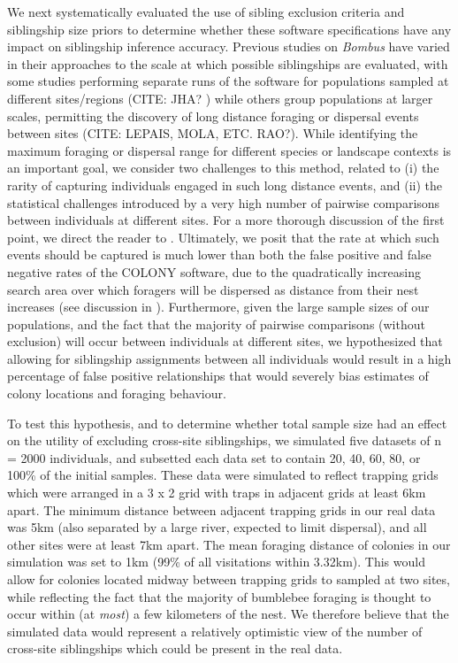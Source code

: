 \documentclass[12pt]{article}
\begin{document}
We next systematically evaluated the use of sibling exclusion criteria and siblingship size priors to determine whether these software specifications have any impact on siblingship inference accuracy. Previous studies on \emph{Bombus} have varied in their approaches to the scale at which possible siblingships are evaluated, with some studies performing separate runs of the software for populations sampled at different sites/regions (CITE: JHA? ) while others group populations at larger scales, permitting the discovery of long distance foraging or dispersal events between sites (CITE: LEPAIS, MOLA, ETC. RAO?). While identifying the maximum foraging or dispersal range for different species or landscape contexts is an important goal, we consider two challenges to this method, related to (i) the rarity of capturing individuals engaged in such long distance events, and (ii) the statistical challenges introduced by a very high number of pairwise comparisons between individuals at different sites. For a more thorough discussion of the first point, we direct the reader to \textcite{lepaisEstimationBumblebeeQueen2010a}. Ultimately, we posit that the rate at which such events should be captured is much lower than both the false positive and false negative rates of the COLONY software, due to the quadratically increasing search area over which foragers will be dispersed as distance from their nest increases (see discussion in \textcite{osborneBumblebeeFlightDistances2008}). Furthermore, given the large sample sizes of our populations, and the fact that the majority of pairwise comparisons (without exclusion) will occur between individuals at different sites, we hypothesized that allowing for siblingship assignments between all individuals would result in a high percentage of false positive relationships that would severely bias estimates of colony locations and foraging behaviour.

To test this hypothesis, and to determine whether total sample size had an effect on the utility of excluding cross-site siblingships, we simulated five datasets of n = 2000 individuals, and subsetted each data set to contain 20, 40, 60, 80, or 100\% of the initial samples. These data were simulated to reflect trapping grids which were arranged in a 3 x 2 grid with traps in adjacent grids at least 6km apart. The minimum distance between adjacent trapping grids in our real data was 5km (also separated by a large river, expected to limit dispersal), and all other sites were at least 7km apart. The mean foraging distance of colonies in our simulation was set to 1km (99\% of all visitations within 3.32km). This would allow for colonies located midway between trapping grids to sampled at two sites, while reflecting the fact that the majority of bumblebee foraging is thought to occur within (at \emph{most}) a few kilometers of the nest. We therefore believe that the simulated data would represent a relatively optimistic view of the number of cross-site siblingships which could be present in the real data.
\end{document}
